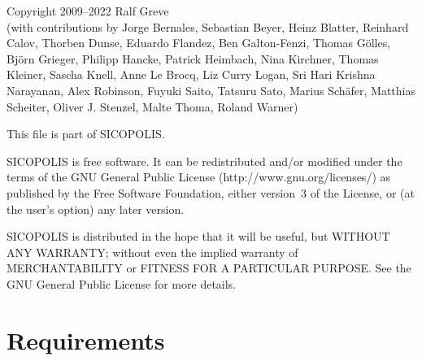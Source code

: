 \documentclass[12pt,a4paper]{article}
\begin{document}
\begin{center}\begin{minipage}{0.85\textwidth}

\begin{small}

\noindent{}Copyright 2009--2022 Ralf Greve\\
(with contributions by Jorge Bernales, Sebastian Beyer, Heinz Blatter, Reinhard Calov, Thorben Dunse, Eduardo Flandez, Ben Galton-Fenzi, Thomas G\"olles, Bj\"orn Grieger, Philipp Hancke, Patrick Heimbach, Nina Kirchner, Thomas Kleiner, Sascha Knell, Anne Le Brocq, Liz Curry Logan, Sri Hari Krishna Narayanan, Alex Robinson, Fuyuki Saito, Tatsuru Sato, Marius Sch\"afer, Matthias Scheiter, Oliver J. Stenzel, Malte Thoma, Roland Warner)

\vspace*{1.5ex}

\noindent{}This file is part of SICOPOLIS.

\vspace*{1.5ex}

\noindent{}SICOPOLIS is free software. It can be redistributed and/or modified under the terms of the GNU General Public License (http://www.gnu.org/licenses/) as published by the Free Software Foundation, either version~3 of the License, or (at the user's option) any later version.

\vspace*{1.5ex}

\noindent{}SICOPOLIS is distributed in the hope that it will be useful, but WITHOUT ANY WARRANTY; without even the implied warranty of MERCHANTABILITY or FITNESS FOR A PARTICULAR PURPOSE.  See the GNU General Public License for more details.

\end{small}

\end{minipage}\end{center}

\vfill

\rule{0mm}{0mm}

\clearpage

\section{Requirements}
\end{document}
